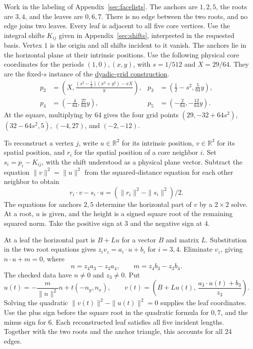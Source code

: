 \documentclass[11pt,letterpaper]{amsart}
\newcommand{\R}{\mathbb R}
\begin{document}
Work in the labeling of Appendix~\ref{sec:facelists}. The anchors
are \(1,2,5\), the roots are \(3,4\), and the leaves are \(0,6,7\).
There is no edge between the two roots, and no edge joins two
leaves. Every leaf is adjacent to all five core vertices.
Use the integral shifts \(K_{ij}\) given in
Appendix~\ref{sec:shifts}, interpreted in the requested basis.
Vertex \(1\) is the origin and all shifts incident to it vanish.
The anchors lie in the horizontal plane at their intrinsic positions.
Use the following physical core coordinates for the periods
\((1,0),(x,y)\), with \(s=1/512\) and \(X=29/64\).
They are the fixed-\(s\) instance of the
\href{https://github.com/vltanh/lean4-origami-torus/blob/fe5a6eee0cf14dc8cfb0614505d63812f1bbfa25/research/type5_completion/dyadic_scale.md}{dyadic-grid construction}.
\[
 \begin{aligned}
 p_2&=\left(X,\frac{(s^2-\tfrac12)(x^2+y^2)-xX}{y}\right),
 & p_3&=\left(\tfrac12-s^2,\tfrac5{64}y\right),\\
 p_4&=\left(-\tfrac4{64},\tfrac{27}{64}y\right),
 & p_5&=\left(-\tfrac2{64},-\tfrac{12}{64}y\right).
 \end{aligned}
\]
At the square, multiplying by 64 gives the four grid points
\((29,-32+64s^2)\), \((32-64s^2,5)\), \((-4,27)\), and \((-2,-12)\).

To reconstruct a vertex \(j\), write \(u\in\R^2\) for its
intrinsic position, \(v\in\R^3\) for its spatial position, and
\(r_i\) for the spatial position of a core neighbor \(i\).
Set \(s_i=p_i-K_{ij}\), with the shift understood as a physical
plane vector. Subtract the equation \(\|v\|^2=\|u\|^2\) from the
squared-distance equation for each other neighbor to obtain
\[
 r_i\cdot v-s_i\cdot u=(\|r_i\|^2-\|s_i\|^2)/2.
 \tag{3}\label{eq:radical}
\]
The equations for anchors \(2,5\) determine the horizontal part
of \(v\) by a \(2\times2\) solve. At a root, \(u\) is given, and
the height is a signed square root of the remaining squared norm.
Take the positive sign at \(3\) and the negative sign at \(4\).

At a leaf the horizontal part is \(B+Lu\) for a vector \(B\)
and matrix \(L\). Substitution in the two root equations gives
\(z_i v_z=a_i\cdot u+b_i\) for \(i=3,4\). Eliminate \(v_z\),
giving \(n\cdot u+m=0\), where
\[
 n=z_4a_3-z_3a_4,\qquad m=z_4b_3-z_3b_4 .
\]
The checked data have \(n\ne0\) and \(z_3\ne0\). Put
\[
 u(t)=-\frac{m}{\|n\|^2}n+t(-n_y,n_x),\qquad
 v(t)=\left(B+Lu(t),\,\frac{a_3\cdot u(t)+b_3}{z_3}\right).
\]
Solving the quadratic \(\|v(t)\|^2-\|u(t)\|^2=0\) supplies the
leaf coordinates. Use the plus sign before the square root
in the quadratic formula for \(0,7\), and the minus sign for
\(6\). Each reconstructed leaf satisfies all five incident
lengths. Together with the two roots and the anchor triangle,
this accounts for all 24 edges.
\end{document}
